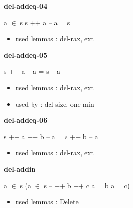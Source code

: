 \documentclass[a4paper]{article}
\begin{document}
\bigskip

{\large\bf del-addeq-04}

\medskip

 \Fol \Not a $\in$ s \Imp s ++ a -- a = s

\begin{itemize}


\item       used lemmas  : del-rax, ext

\end{itemize}

\medskip

\bigskip

{\large\bf del-addeq-05}

\medskip

 \Fol s ++ a -- a = s -- a

\begin{itemize}


\item       used lemmas  : del-rax, ext
\item       used by      : del-size, one-min

\end{itemize}

\medskip

\bigskip

{\large\bf del-addeq-06}

\medskip

 \Fol s ++ a ++ b -- a = s ++ b -- a

\begin{itemize}


\item       used lemmas  : del-rax, ext

\end{itemize}

\medskip

\bigskip

{\large\bf del-addin}

\medskip

 \Fol \Not a $\in$ s \Imp (a $\in$ s --  ++ b ++ c \Equiv a = b \Or a = c)

\begin{itemize}


\item       used lemmas  : Delete

\end{itemize}

\medskip

\bigskip
\end{document}
